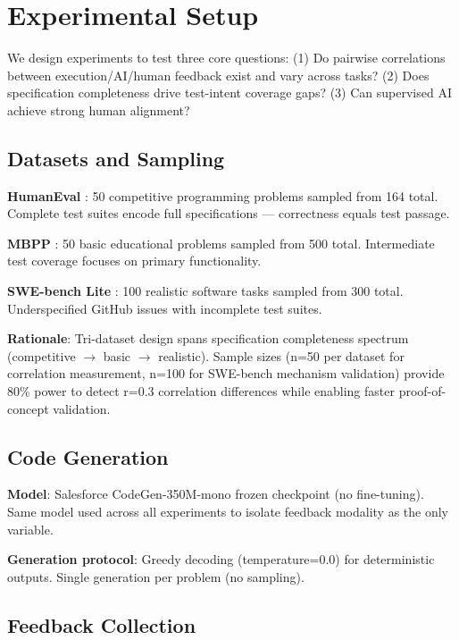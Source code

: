 \section{Experimental Setup}

We design experiments to test three core questions: (1) Do pairwise correlations between execution/AI/human feedback exist and vary across tasks? (2) Does specification completeness drive test-intent coverage gaps? (3) Can supervised AI achieve strong human alignment?

\subsection{Datasets and Sampling}

\textbf{HumanEval} \cite{chen2021evaluating}: 50 competitive programming problems sampled from 164 total. Complete test suites encode full specifications --- correctness equals test passage.

\textbf{MBPP} \cite{austin2021program}: 50 basic educational problems sampled from 500 total. Intermediate test coverage focuses on primary functionality.

\textbf{SWE-bench Lite} \cite{jimenez2023swe}: 100 realistic software tasks sampled from 300 total. Underspecified GitHub issues with incomplete test suites.

\textbf{Rationale}: Tri-dataset design spans specification completeness spectrum (competitive $\rightarrow$ basic $\rightarrow$ realistic). Sample sizes (n=50 per dataset for correlation measurement, n=100 for SWE-bench mechanism validation) provide 80\% power to detect r=0.3 correlation differences while enabling faster proof-of-concept validation.

\subsection{Code Generation}

\textbf{Model}: Salesforce CodeGen-350M-mono frozen checkpoint (no fine-tuning). Same model used across all experiments to isolate feedback modality as the only variable.

\textbf{Generation protocol}: Greedy decoding (temperature=0.0) for deterministic outputs. Single generation per problem (no sampling).

\subsection{Feedback Collection}

